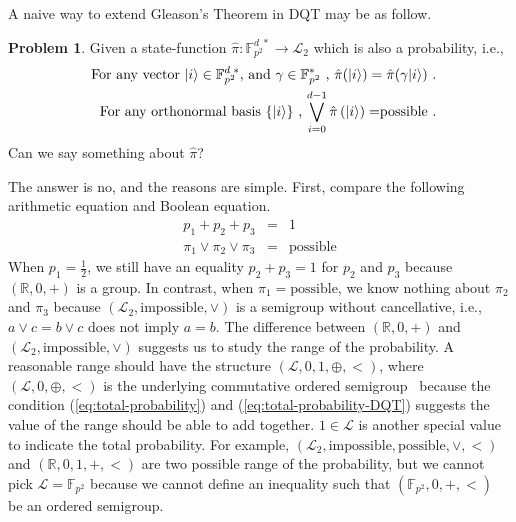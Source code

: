 \documentclass[english,12pt]{iopart}
\theoremstyle{plain}
\theoremstyle{definition}
\newtheorem{problem}[thm]{Problem}
\newcommand{\ff}[1]{\mathbb{F}_{#1}}
\newcommand{\ffzd}[1]{{\mathbb{F}^{d\;*}_{#1}}}
\begin{document}
A naive way to extend Gleason's Theorem in DQT may be as follow.
\begin{problem}
Given a state-function $\hat{\pi}:\ffzd{p^{2}}\rightarrow\mathscr{L}_{2}$
which is also a probability, i.e., 
\begin{eqnarray}
 &  & \textrm{For any vector }\ket{i}\in\ffzd{p^{2}}\textrm{, and }\gamma\in\ff{p^{2}}^{*}\textrm{ , }\hat{\pi}(\ket{i})=\hat{\pi}(\gamma\ket{i})\textrm{ . }\label{eq:parallel-DQT}\\
 &  & \textrm{For any orthonormal basis }\{\ket{i}\}\textrm{ , }{\displaystyle \bigvee_{i=0}^{d-1}\hat{\pi}\left(\ket{i}\right)=}\textrm{possible . }\label{eq:total-probability-DQT}
\end{eqnarray}
Can we say something about $\hat{\pi}$?
\end{problem}
The answer is no, and the reasons are simple. First, compare the following
arithmetic equation and Boolean equation.
\begin{eqnarray}
p_{1}+p_{2}+p_{3} & = & 1\label{eq:arithmetic}\\
\pi_{1}\vee\pi_{2}\vee\pi_{3} & = & \text{possible}\label{eq:Boolean}
\end{eqnarray}
When $p_{1}=\frac{1}{2}$, we still have an equality $p_{2}+p_{3}=1$
for $p_{2}$ and $p_{3}$ because $\left(\mathbb{R},0,+\right)$ is
a group. In contrast, when $\pi_{1}=\text{possible}$, we know nothing
about $\pi_{2}$ and $\pi_{3}$ because $\left(\mathscr{L}_{2},\text{impossible},\vee\right)$
is a semigroup without cancellative, i.e., $a\vee c=b\vee c$ does
not imply $a=b$. The difference between $\left(\mathbb{R},0,+\right)$
and $\left(\mathscr{L}_{2},\text{impossible},\vee\right)$ suggests
us to study the range of the probability. A reasonable range should
have the structure $\left(\mathscr{L},0,1,\oplus,<\right)$, where
$\left(\mathscr{L},0,\oplus,<\right)$ is the underlying commutative
ordered semigroup~\cite{clifford1958} because the condition (\ref{eq:total-probability})
and (\ref{eq:total-probability-DQT}) suggests the value of the range
should be able to add together. $1\in\mathscr{L}$ is another special
value to indicate the total probability. For example, $\left(\mathscr{L}_{2},\text{impossible},\text{possible},\vee,<\right)$
and $\left(\mathbb{R},0,1,+,<\right)$ are two possible range of the
probability, but we cannot pick $\mathscr{L}=\ff{p^{2}}$ because
we cannot define an inequality such that $\left(\ff{p^{2}},0,+,<\right)$
be an ordered semigroup. 
\end{document}
